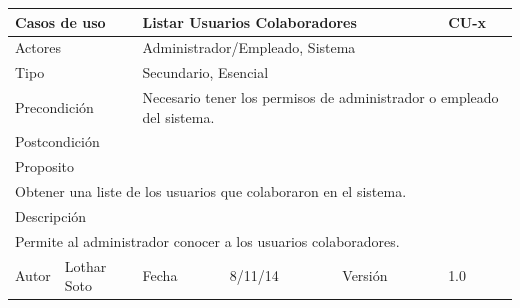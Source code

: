 \documentclass{article}
\begin{document}
\begin{table}[h]
\begin{tabular}{|l|l|l|l|l|l|}
\hline
\multicolumn{2}{|p{2cm}|}{Casos de uso}  & \multicolumn{3}{p{7cm}|}{\textbf{Listar Usuarios Colaboradores}} & CU-x \\
\hline
\multicolumn{2}{|p{2cm}|}{Actores}       & \multicolumn{4}{p{8cm}|}{Administrador/Empleado, Sistema}        \\
\hline
\multicolumn{2}{|p{2cm}|}{Tipo}          & \multicolumn{4}{p{8cm}|}{Secundario, Esencial}        \\
\hline
\multicolumn{2}{|p{2cm}|}{Precondición}  & \multicolumn{4}{p{8cm}|}{Necesario tener los permisos de administrador o empleado del sistema.}        \\
\hline
\multicolumn{2}{|p{2cm}|}{Postcondición} & \multicolumn{4}{p{8cm}|}{}        \\
\hline
\multicolumn{6}{|p{10cm}|}{Proposito}                                   \\
\hline
\multicolumn{6}{|p{10cm}|}{Obtener una liste de los usuarios que colaboraron en el sistema.}                                            \\
\hline
\multicolumn{6}{|p{10cm}|}{Descripción}                                 \\
\hline
\multicolumn{6}{|p{10cm}|}{Permite al administrador conocer a los usuarios colaboradores.}                                            \\
\hline
Autor          &       Lothar Soto        & Fecha    &  8/11/14   &   Versión  & 1.0\\    
\hline
\end{tabular}
\end{table}
\end{document}
